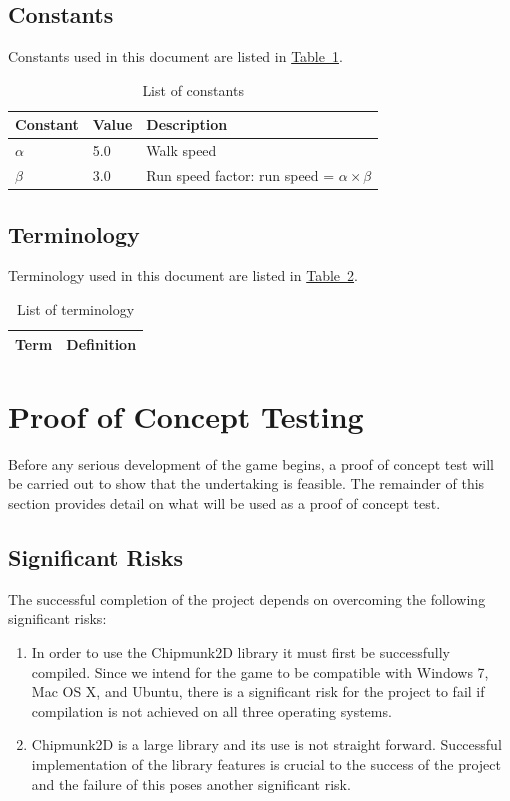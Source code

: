 \documentclass[12pt, titlepage]{article}
\begin{document}
\subsection{Constants}
Constants used in this document are listed in \hyperref[tab:constants]{Table~\ref*{tab:constants}}.
\begin{table}[ht]
\caption{List of constants} \label{tab:constants}
\begin{tabularx}{\textwidth}{p{3cm}p{2cm}X}
\toprule {\bf Constant} & {\bf Value} & {\bf Description}\\
\midrule
$\alpha$ & 5.0 & Walk speed\\
$\beta$ & 3.0 & Run speed factor: run speed = $\alpha \times \beta$\\
\bottomrule
\end{tabularx}
\end{table}
\subsection{Terminology}
Terminology used in this document are listed in \hyperref[tab:terminology]{Table~\ref*{tab:terminology}}.
\begin{table}[ht]
\caption{List of terminology} \label{tab:terminology}
\begin{tabularx}{\textwidth}{p{3cm}X}
\toprule {\bf Term} & {\bf Definition}\\
\midrule
\bottomrule
\end{tabularx}
\end{table}

\section{Proof of Concept Testing}
\label{sec:poc}
Before any serious development of the game begins, a proof of concept test will be carried out to show that the undertaking is feasible.  The remainder of this section provides detail on what will be used as a proof of concept test.

\subsection{Significant Risks}
The successful completion of the project depends on overcoming the following significant risks:
\begin{enumerate}
  \item In order to use the Chipmunk2D library it must first be successfully compiled.  Since we intend for the game to be compatible with Windows 7, Mac OS X, and Ubuntu, there is a significant risk for the project to fail if compilation is not achieved on all three operating systems.
  \item Chipmunk2D is a large library and its use is not straight forward.  Successful implementation of the library features is crucial to the success of the project and the failure of this poses another significant risk.
\end{enumerate}
\end{document}
